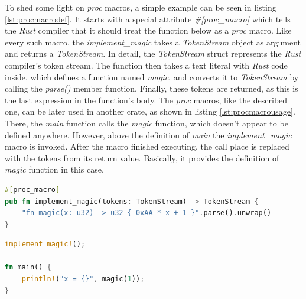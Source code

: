 To shed some light on \textit{proc} macros, a simple example can be seen in listing \ref{lst:procmacrodef}. It starts with a special attribute \textit{\#[proc\_macro]} which tells the \textit{Rust} compiler that it should treat the function below as a \textit{proc} macro. Like every such macro, the \textit{implement\_magic} takes a \textit{TokenStream} object as argument and returns a \textit{TokenStream}. In detail, the \textit{TokenStream} struct represents the \textit{Rust} compiler's token stream. The function then takes a text literal with \textit{Rust} code inside, which defines a function named \textit{magic}, and converts it to \textit{TokenStream} by calling the \textit{parse()} member function. Finally, these tokens are returned, as this is the last expression in the function's body. The \textit{proc} macros, like the described one, can be later used in another crate, as shown in listing \ref{lst:procmacrousage}. There, the \textit{main} function calls the \textit{magic} function, which doesn't appear to be defined anywhere. However, above the definition of \textit{main} the \textit{implement\_magic} macro is invoked. After the macro finished executing, the call place is replaced with the tokens from its return value. Basically, it provides the definition of \textit{magic} function in this case.

\begin{minipage}{\linewidth}
\begin{lstlisting}[language=rust,caption={Exmaple of a \textit{proc} macro definition},label={lst:procmacrodef}]
#[proc_macro]
pub fn implement_magic(tokens: TokenStream) -> TokenStream {
    "fn magic(x: u32) -> u32 { 0xAA * x + 1 }".parse().unwrap()
}
\end{lstlisting}
\end{minipage}

\begin{minipage}{\linewidth}
\begin{lstlisting}[language=rust,caption={Exmaple usage of a \textit{proc} macro},label={lst:procmacrousage}]
implement_magic!();

fn main() {
    println!("x = {}", magic(1));
}
\end{lstlisting}
\end{minipage}

